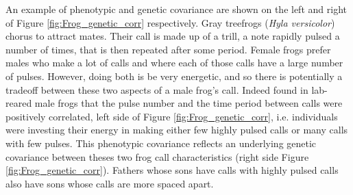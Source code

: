 An example of phenotypic and genetic covariance are shown on the left
and right of Figure \ref{fig:Frog_genetic_corr} respectively. Gray
treefrogs ({\it Hyla versicolor}) chorus to attract mates. Their call
is made up of a trill, a note rapidly pulsed a number of times, that
is then repeated after some
period. Female frogs prefer males who make a lot of calls and where each
of those calls have a large number
of pulses. However, doing both is be very energetic, and so
there is potentially a tradeoff between these two aspects of a male frog's
call. Indeed \citet{welch2014multivariate} found
in lab-reared male frogs that the pulse number and the time period between
calls were positively correlated, left side of Figure \ref{fig:Frog_genetic_corr}, i.e. individuals were investing
their energy in making either few highly pulsed calls or many calls
with few pulses. This phenotypic covariance reflects an underlying 
genetic covariance between theses two frog call
characteristics (right side  Figure \ref{fig:Frog_genetic_corr}). Fathers whose sons have calls with highly pulsed
calls also have sons whose calls are more spaced apart.

